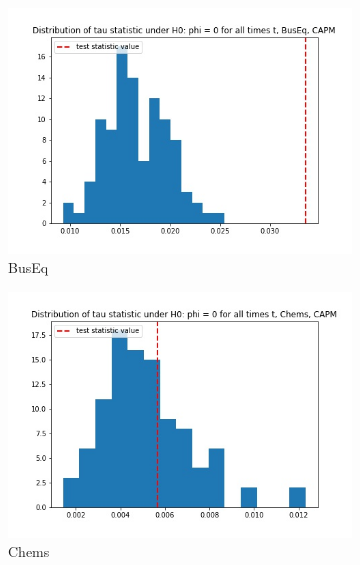 \documentclass{article}
\begin{document}
\begin{figure}
  \begin{subfigure}[b]{0.5\textwidth}
    \centering
    \includegraphics[width=\textwidth]{BusEq/tau_hist_02_CAPM.jpg}
    \caption{BusEq}
    \label{fig:1}
  \end{subfigure}
  \begin{subfigure}[b]{0.5\textwidth}
    \centering
    \includegraphics[width=\textwidth]{Chems/tau_hist_02_CAPM.jpg}
    \caption{Chems}
    \label{fig:2}
  \end{subfigure}
  \begin{subfigure}[b]{0.5\textwidth}
    \centering

\end{subfigure}
\end{figure}
\end{document}
